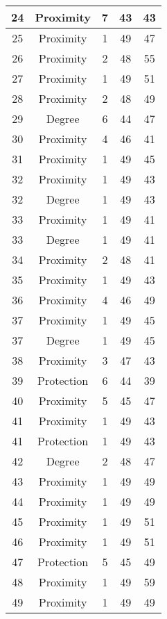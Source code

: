 \documentclass[results.tex]{subfiles}
\begin{document}
\begin{center}
\begin{tabular}{| c || c | c | c | c |}
    \hline
    24 & Proximity & 7 & 43 & 43 \\ 
    \hline
    25 & Proximity & 1 & 49 & 47 \\ 
    \hline
    26 & Proximity & 2 & 48 & 55 \\ 
    \hline
    27 & Proximity & 1 & 49 & 51 \\ 
    \hline
    28 & Proximity & 2 & 48 & 49 \\ 
    \hline
    29 & Degree & 6 & 44 & 47 \\ 
    \hline
    30 & Proximity & 4 & 46 & 41 \\ 
    \hline
    31 & Proximity & 1 & 49 & 45 \\ 
    \hline
    32 & Proximity & 1 & 49 & 43 \\ 
    \hline
    32 & Degree & 1 & 49 & 43 \\ 
    \hline
    33 & Proximity & 1 & 49 & 41 \\ 
    \hline
    33 & Degree & 1 & 49 & 41 \\ 
    \hline
    34 & Proximity & 2 & 48 & 41 \\ 
    \hline
    35 & Proximity & 1 & 49 & 43 \\ 
    \hline
    36 & Proximity & 4 & 46 & 49 \\ 
    \hline
    37 & Proximity & 1 & 49 & 45 \\ 
    \hline
    37 & Degree & 1 & 49 & 45 \\ 
    \hline
    38 & Proximity & 3 & 47 & 43 \\ 
    \hline
    39 & Protection & 6 & 44 & 39 \\ 
    \hline
    40 & Proximity & 5 & 45 & 47 \\ 
    \hline
    41 & Proximity & 1 & 49 & 43 \\ 
    \hline
    41 & Protection & 1 & 49 & 43 \\ 
    \hline
    42 & Degree & 2 & 48 & 47 \\ 
    \hline
    43 & Proximity & 1 & 49 & 49 \\ 
    \hline
    44 & Proximity & 1 & 49 & 49 \\ 
    \hline
    45 & Proximity & 1 & 49 & 51 \\ 
    \hline
    46 & Proximity & 1 & 49 & 51 \\ 
    \hline
    47 & Protection & 5 & 45 & 49 \\ 
    \hline
    48 & Proximity & 1 & 49 & 59 \\ 
    \hline
    49 & Proximity & 1 & 49 & 49 \\ 
    \hline   \end{tabular}
\end{center}
\end{document}
